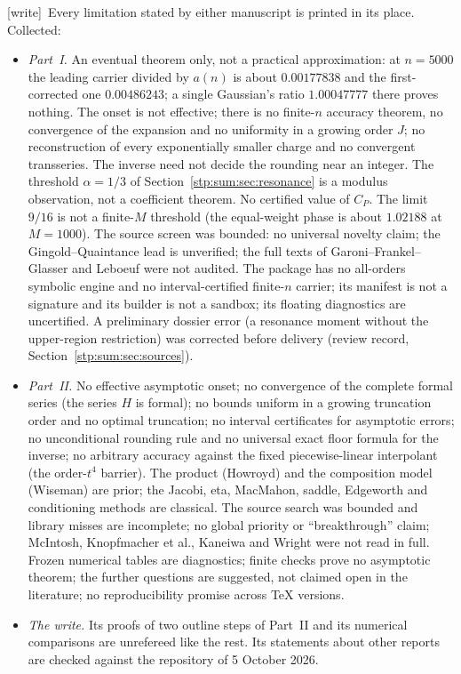 \documentclass[11pt]{article}
\theoremstyle{remark}\newtheorem{remark}[theorem]{Remark}
\newcommand{\wtag}{\textup{[write]}}
\begin{document}
\wtag\ Every limitation stated by either manuscript is printed in its
place. Collected:
\begin{itemize}
\item \emph{Part~I.} An eventual theorem only, not a practical
approximation: at $n=5000$ the leading carrier divided by $a(n)$ is about
$0.00177838$ and the first-corrected one $0.00486243$; a single Gaussian's
ratio $1.00047777$ there proves nothing. The onset is not effective; there
is no finite-$n$ accuracy theorem, no convergence of the expansion and no
uniformity in a growing order $J$; no reconstruction of every
exponentially smaller charge and no convergent transseries. The inverse need
not decide the rounding near an integer. The threshold $\alpha=1/3$ of
Section~\ref{stp:sum:sec:resonance} is a modulus observation, not a
coefficient theorem. No certified value of $C_P$. The limit $9/16$ is not a
finite-$M$ threshold (the equal-weight phase is about $1.02188$ at
$M=1000$). The source screen was bounded: no universal novelty claim; the
Gingold--Quaintance lead is unverified; the full texts of
Garoni--Frankel--Glasser and Leboeuf were not audited. The package has no
all-orders symbolic engine and no interval-certified finite-$n$ carrier; its
manifest is not a signature and its builder is not a sandbox; its floating
diagnostics are uncertified. A preliminary dossier error (a resonance
moment without the upper-region restriction) was corrected before
delivery (review record, Section~\ref{stp:sum:sec:sources}).
\item \emph{Part~II.} No effective asymptotic onset; no convergence of the
complete formal series (the series $H$ is formal); no bounds uniform in a
growing truncation order and no optimal truncation; no interval
certificates for asymptotic errors; no unconditional rounding rule and no
universal exact floor formula for the inverse; no arbitrary accuracy against
the fixed piecewise-linear interpolant (the order-$t^4$ barrier). The product
(Howroyd) and the composition model (Wiseman) are prior; the Jacobi, eta,
MacMahon, saddle, Edgeworth and conditioning methods are classical. The
source search was bounded and library misses are incomplete; no global
priority or ``breakthrough'' claim; McIntosh, Knopfmacher et al., Kaneiwa
and Wright were not read in full. Frozen numerical tables are diagnostics;
finite checks prove no asymptotic theorem; the further questions are
suggested, not claimed open in the literature; no reproducibility promise
across TeX versions.
\item \emph{The write.} Its proofs of two outline steps of Part~II and its
numerical comparisons are unrefereed like the rest. Its statements about
other reports are checked against the repository of 5 October 2026.
\end{itemize}
\end{document}
